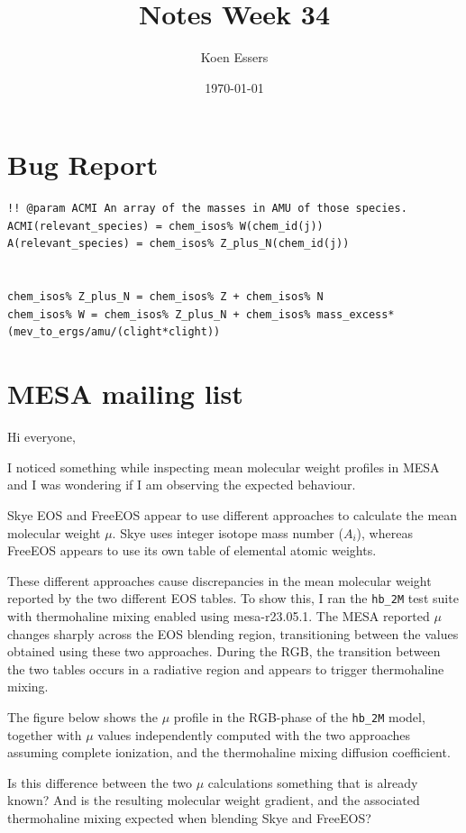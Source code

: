 \documentclass[a4paper,10pt]{article}
\title{Notes Week 34}
\author{Koen Essers}
\date{\today}
\begin{document}
\setuplayout
\section{Bug Report}

\begin{verbatim}
!! @param ACMI An array of the masses in AMU of those species.
ACMI(relevant_species) = chem_isos% W(chem_id(j))
A(relevant_species) = chem_isos% Z_plus_N(chem_id(j))


chem_isos% Z_plus_N = chem_isos% Z + chem_isos% N
chem_isos% W = chem_isos% Z_plus_N + chem_isos% mass_excess*(mev_to_ergs/amu/(clight*clight))
\end{verbatim}

\section{MESA mailing list}

Hi everyone,

I noticed something while inspecting mean molecular weight profiles in MESA and I was wondering if I am observing the expected behaviour.

Skye EOS and FreeEOS appear to use different approaches to calculate the mean molecular weight \(\mu \).
Skye uses integer isotope mass number (\(A_{i} \)), whereas FreeEOS appears to use its own table of elemental atomic weights.

These different approaches cause discrepancies in the mean molecular weight reported by the two different EOS tables.
To show this, I ran the \lstinline[style=output, breaklines=true]|hb_2M| test suite with thermohaline mixing enabled using mesa-r23.05.1.
The MESA reported \(\mu \) changes sharply across the EOS blending region, transitioning between the values obtained using these two approaches.
During the RGB, the transition between the two tables occurs in a radiative region and appears to trigger thermohaline mixing.

The figure below shows the \(\mu \) profile in the RGB-phase of the \lstinline[style=output, breaklines=true]|hb_2M| model, together with \(\mu \) values independently computed with the two approaches assuming complete ionization, and the thermohaline mixing diffusion coefficient.
\begin{figure}[ht]
	\centering
\end{figure}

Is this difference between the two \(\mu \) calculations something that is already known?
And is the resulting molecular weight gradient, and the associated thermohaline mixing expected when blending Skye and FreeEOS?
\end{document}
